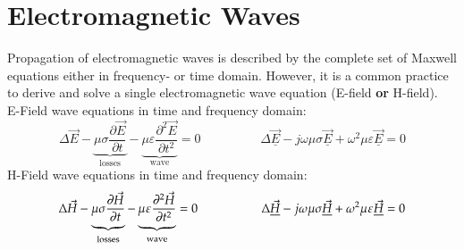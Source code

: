 \section{Electromagnetic Waves}
Propagation of electromagnetic waves is described by the complete set of Maxwell equations either in frequency- or time domain. However, it is a common practice to derive and solve a single electromagnetic wave equation (E-field \textbf{or} H-field).\\

E-Field wave equations in time and frequency domain:
\begin{equation*}
	\Delta \vec{E} - \underbrace{\mu\sigma\frac{\partial \vec{E}}{\partial t}}_{\textrm{losses}} - \underbrace{\mu\varepsilon\frac{\partial^2 \vec{E}}{\partial t^2}}_{\textrm{wave}} = 0
	\hspace{2cm}
	\Delta \underline{\vec{E}} - j\omega\mu\sigma\underline{\vec{E}} + \omega^2\mu\varepsilon\underline{\vec{E}} = 0
\end{equation*}
H-Field wave equations in time and frequency domain:
\begin{equation*}
	\Delta\vec{H} - \underbrace{\mu\sigma\frac{\partial \vec{H}}{\partial t}}_{\textrm{losses}} - \underbrace{\mu\varepsilon\frac{\partial^2 \vec{H}}{\partial t^2}}_{\textrm{wave}} = 0
	\hspace{1.8cm}
	\Delta \underline{\vec{H}} - j\omega\mu\sigma\underline{\vec{H}} + \omega^2\mu\varepsilon\underline{\vec{H}} = 0
\end{equation*}


